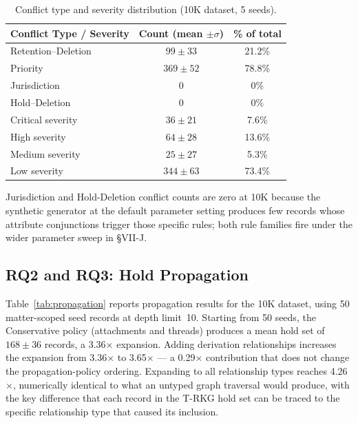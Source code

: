 \documentclass{ieeeaccess}
\begin{document}
\begin{table}[t]
\centering
\caption{Conflict type and severity distribution (10K dataset, 5 seeds).}
\label{tab:typesev}
\begin{tabular}{lcc}
\hline\hline
Conflict Type / Severity & Count (mean $\pm \sigma$) & \% of total \\
\hline
Retention--Deletion & $99 \pm 33$  & 21.2\% \\
Priority            & $369 \pm 52$ & 78.8\% \\
Jurisdiction        & 0            & 0\% \\
Hold--Deletion      & 0            & 0\% \\
\hline
Critical severity   & $36 \pm 21$  & 7.6\% \\
High severity       & $64 \pm 28$  & 13.6\% \\
Medium severity     & $25 \pm 27$  & 5.3\% \\
Low severity        & $344 \pm 63$ & 73.4\% \\
\hline\hline
\end{tabular}
\end{table}

Jurisdiction and Hold-Deletion conflict counts are zero at 10K because the synthetic generator at the default parameter setting produces few records whose attribute conjunctions trigger those specific rules; both rule families fire under the wider parameter sweep in §VII-J.

\subsection{RQ2 and RQ3: Hold Propagation}

Table~\ref{tab:propagation} reports propagation results for the 10K dataset, using 50 matter-scoped seed records at depth limit~10. Starting from 50 seeds, the Conservative policy (attachments and threads) produces a mean hold set of $168 \pm 36$ records, a 3.36$\times$ expansion. Adding derivation relationships increases the expansion from 3.36$\times$ to 3.65$\times$ --- a 0.29$\times$ contribution that does not change the propagation-policy ordering. Expanding to all relationship types reaches 4.26$\times$, numerically identical to what an untyped graph traversal would produce, with the key difference that each record in the T-RKG hold set can be traced to the specific relationship type that caused its inclusion.
\end{document}
